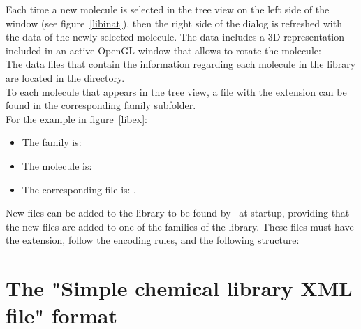 \clearpage
\noindent Each time a new molecule is selected in the tree view on the left side of the window (see figure~\ref{libinat}),
then the right side of the  dialog is refreshed with the data of the newly selected molecule. 
The data includes a 3D representation included in an active OpenGL window that allows to rotate the molecule: \\
\laf The data files that contain the information regarding each molecule in the library are located in the  directory. \\
To each molecule that appears in the  tree view, a file with the  extension can be found in the corresponding family subfolder. \\
For the example in figure~\ref{libex}:
\begin{itemize}
\item The family is: 
\item The molecule is: 
\item The corresponding file is: . 
\end{itemize}
New files can be added to the library to be found by \atomes\ at startup, providing that the new files are added to one of the families of the library. 
These files must have the  extension, follow the  encoding rules, and the following structure:

\section*{The  "Simple chemical library XML file" format}
\sclxml
